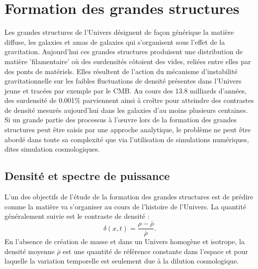 
\chapter{Formation des grandes structures}
\label{s:struct}
Les grandes structures de l'Univers désignent de façon générique la matière diffuse, les galaxies et amas de galaxies qui s'organisent sous l'effet de la gravitation. Aujourd'hui ces grandes structures produisent une distribution de matière 'filamentaire' où des surdensités côtoient des vides, reliées entre elles par des ponts de matériels. Elles résultent de l'action du mécanisme d'instabilité gravitationnelle sur les faibles fluctuations de densité présentes dans l'Univers jeune et tracées par exemple par le CMB. Au cours des 13.8 milliards d'années, des surdensité de 0.001\% parviennent ainsi à croître pour atteindre des contrastes de densité mesurés aujourd'hui dans les galaxies d'au moins plusieurs centaines. Si un grande partie des processus à l'œuvre lors de la formation des grandes structures peut être saisis par une approche analytique, le problème ne peut être abordé dans toute sa complexité que via l'utilisation de simulations numériques, dites simulation cosmologiques.

\section{Densité et spectre de puissance}
L'un des objectifs de l'étude de la formation des grandes structures est de prédire comme la matière va s'organiser au cours de l'histoire de l'Univers. La quantité généralement suivie est le contraste de densité :
\begin{equation}
\delta(x,t) =\frac{\rho-\bar\rho}{\bar\rho}.
\end{equation}
En l'absence de création de masse et dans un Univers homogène et isotrope, la densité moyenne $\bar{\rho}$ est une quantité de référence constante dans l'espace et pour laquelle la variation temporelle est seulement due à la dilution cosmologique. 

